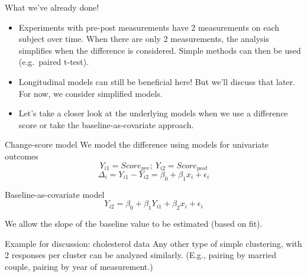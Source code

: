 \documentclass[
  9pt,
  ignorenonframetext,
]{beamer}
\providecommand{\tightlist}{%
  \setlength{\itemsep}{0pt}\setlength{\parskip}{0pt}}
\begin{document}
\begin{frame}{What we've already done!}
\protect\hypertarget{what-weve-already-done}{}
\begin{itemize}
\tightlist
\item
  Experiments with pre-post measurements have 2 measurements on each
  subject over time. When there are only 2 measurements, the analysis
  simplifies when the difference is considered. Simple methods can then
  be used (e.g.~paired t-test).
\item
  Longitudinal models can still be beneficial here! But we'll discuss
  that later. For now, we consider simplified models.
\item
  Let's take a closer look at the underlying models when we use a
  difference score or take the baseline-as-covariate approach.
\end{itemize}

\begin{block}{Change-score model}
\protect\hypertarget{change-score-model}{}
We model the difference using models for univariate outcomes \[
Y_{i1} = Score_{pre}; \ Y_{i2} = Score_{post} 
\] \vspace{-5mm} \[
\Delta_i = Y_{i1} - Y_{i2} = \beta_0 + \beta_1 x_i + \epsilon_i
\]
\end{block}

\begin{block}{Baseline-as-covariate model}
\protect\hypertarget{baseline-as-covariate-model}{}
\[
Y_{i2} = \beta_0 +\beta_1Y_{i1} + \beta_2 x_i + \epsilon_i
\]

We allow the slope of the baseline value to be estimated (based on fit).
\end{block}
\end{frame}

\begin{frame}{}
\protect\hypertarget{section-9}{}
\begin{block}{Example for discussion: cholesterol data}
\protect\hypertarget{example-for-discussion-cholesterol-data}{}
Any other type of simple clustering, with 2 responses per cluster can be
analyzed similarly. (E.g., pairing by married couple, pairing by year of
measurement.)
\end{block}
\end{frame}
\end{document}
